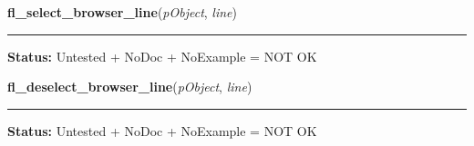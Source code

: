     \label{xformslib:library:fl_select_browser_line}

    \vspace{0.5ex}

\hspace{.8\funcindent}\begin{boxedminipage}{\funcwidth}

    \raggedright \textbf{fl\_select\_browser\_line}(\textit{pObject}, \textit{line})

    \vspace{-1.5ex}

    \rule{\textwidth}{0.5\fboxrule}
\setlength{\parskip}{2ex}
\setlength{\parskip}{1ex}
\textbf{Status:} Untested + NoDoc + NoExample = NOT OK



    \end{boxedminipage}

    \label{xformslib:library:fl_deselect_browser_line}

    \vspace{0.5ex}

\hspace{.8\funcindent}\begin{boxedminipage}{\funcwidth}

    \raggedright \textbf{fl\_deselect\_browser\_line}(\textit{pObject}, \textit{line})

    \vspace{-1.5ex}

    \rule{\textwidth}{0.5\fboxrule}
\setlength{\parskip}{2ex}
\setlength{\parskip}{1ex}
\textbf{Status:} Untested + NoDoc + NoExample = NOT OK



    \end{boxedminipage}

    \label{xformslib:library:fl_deselect_browser}

    \vspace{0.5ex}

